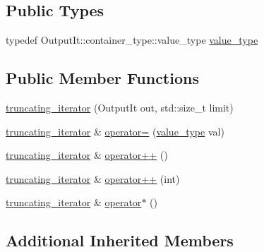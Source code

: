 \subsection*{Public Types}
\begin{DoxyCompactItemize}
\item 
typedef Output\+It\+::container\+\_\+type\+::value\+\_\+type \hyperlink{classinternal_1_1truncating__iterator_3_01_output_it_00_01std_1_1true__type_01_4_a4a9bd141b663dc9b2f4cd834b99690ae}{value\+\_\+type}
\end{DoxyCompactItemize}
\subsection*{Public Member Functions}
\begin{DoxyCompactItemize}
\item 
\hyperlink{classinternal_1_1truncating__iterator_3_01_output_it_00_01std_1_1true__type_01_4_af78656fa13e48e2cddf4053477f5457b}{truncating\+\_\+iterator} (Output\+It out, std\+::size\+\_\+t limit)
\item 
\hyperlink{classinternal_1_1truncating__iterator}{truncating\+\_\+iterator} \& \hyperlink{classinternal_1_1truncating__iterator_3_01_output_it_00_01std_1_1true__type_01_4_a3fd23f1107d8e84d5e9c307f2e187c63}{operator=} (\hyperlink{classinternal_1_1truncating__iterator_3_01_output_it_00_01std_1_1true__type_01_4_a4a9bd141b663dc9b2f4cd834b99690ae}{value\+\_\+type} val)
\item 
\hyperlink{classinternal_1_1truncating__iterator}{truncating\+\_\+iterator} \& \hyperlink{classinternal_1_1truncating__iterator_3_01_output_it_00_01std_1_1true__type_01_4_aa9fab2b005af99f4ec60189ad09b71d2}{operator++} ()
\item 
\hyperlink{classinternal_1_1truncating__iterator}{truncating\+\_\+iterator} \& \hyperlink{classinternal_1_1truncating__iterator_3_01_output_it_00_01std_1_1true__type_01_4_a2d7e7e795edf1078b13a728c0d6ace9e}{operator++} (int)
\item 
\hyperlink{classinternal_1_1truncating__iterator}{truncating\+\_\+iterator} \& \hyperlink{classinternal_1_1truncating__iterator_3_01_output_it_00_01std_1_1true__type_01_4_abe59e545d0c6bb7097296a96133f5517}{operator$\ast$} ()
\end{DoxyCompactItemize}
\subsection*{Additional Inherited Members}


